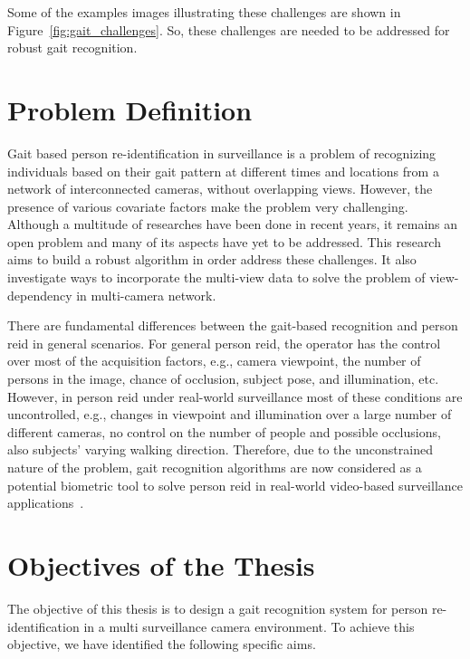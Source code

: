 Some of the examples images illustrating these challenges are shown in Figure~\ref{fig:gait_challenges}. So, these challenges are needed to be addressed for robust gait recognition.



\section{Problem Definition}
Gait based person re-identification in surveillance is a problem of recognizing individuals based on their gait pattern at different times and locations from a network of interconnected cameras, without overlapping views. However, the presence of various covariate factors make the problem very challenging. Although a multitude of researches have been done in recent years, it remains an open problem and many of its aspects have yet to be addressed. This research aims to 
build a robust algorithm in order address these challenges. It also investigate ways to incorporate the multi-view data to solve the problem of view-dependency in multi-camera network.

There are fundamental differences between the gait-based recognition and person \gls{reid} in general scenarios. For general person \gls{reid}, the operator has the control over most of the acquisition factors, e.g., camera viewpoint, the number of persons in the image, chance of occlusion, subject pose, and illumination, etc. However, in person \gls{reid} under real-world surveillance most of these conditions are uncontrolled, e.g., changes in viewpoint and illumination over a large number of different cameras, no control on the number of people and possible occlusions, also subjects’ varying walking direction. Therefore, due to the unconstrained nature of the problem, gait recognition algorithms are now considered as a potential biometric tool to solve person \gls{reid} in real-world video-based surveillance applications~\cite{Lee_14}.




\section{Objectives of the Thesis}
The objective of this thesis is to design a gait recognition system for person re-identification in a multi surveillance camera environment. To achieve this objective, we have identified the following specific aims.

